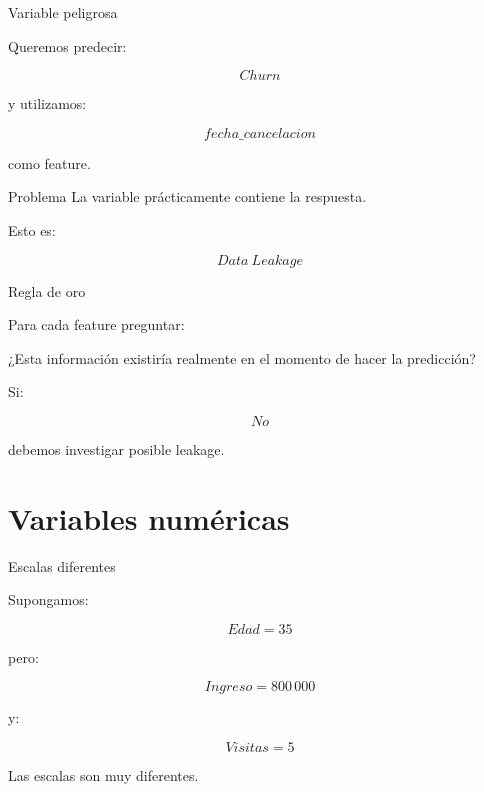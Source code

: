 \documentclass[aspectratio=169,11pt]{beamer}
\begin{document}
\begin{frame}{Variable peligrosa}

Queremos predecir:

\[
Churn
\]

y utilizamos:

\[
fecha\_cancelacion
\]

como feature.

\vspace{0.5cm}

\begin{alertblock}{Problema}
La variable prácticamente contiene la respuesta.
\end{alertblock}

Esto es:

\[
\boxed{
Data\ Leakage
}
\]

\end{frame}


\begin{frame}{Regla de oro}

Para cada feature preguntar:

\begin{center}

\Large
¿Esta información existiría realmente
en el momento de hacer la predicción?
\end{center}

Si:

\[
No
\]

debemos investigar posible leakage.

\end{frame}

\section{Variables numéricas}

\begin{frame}{Escalas diferentes}

Supongamos:

\[
Edad=35
\]

pero:

\[
Ingreso=800\,000
\]

y:

\[
Visitas=5
\]

\vspace{0.5cm}

Las escalas son muy diferentes.

\end{frame}
\end{document}
